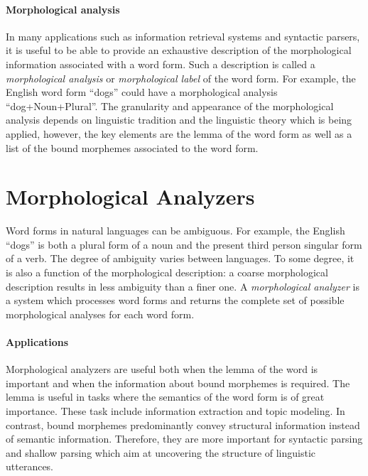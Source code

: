 \paragraph{Morphological analysis} In many applications such as
information retrieval systems and syntactic parsers, it is useful to
be able to provide an exhaustive description of the morphological
information associated with a word form. Such a description is called
a {\it morphological analysis} or {\it morphological label} of the word
form. For example, the English word form ``dogs'' could have a
morphological analysis ``dog+Noun+Plural''. The granularity and
appearance of the morphological analysis depends on linguistic
tradition and the linguistic theory which is being applied, however,
the key elements are the lemma of the word form as well as a list of
the bound morphemes associated to the word form.

\section{Morphological Analyzers}
Word forms in natural languages can be ambiguous. For example, the
English ``dogs'' is both a plural form of a noun and the present third
person singular form of a verb. The degree of ambiguity varies between
languages. To some degree, it is also a function of the morphological
description: a coarse morphological description results in less
ambiguity than a finer one. A {\it morphological analyzer} is a system
which processes word forms and returns the complete set of possible
morphological analyses for each word form.

\paragraph{Applications} Morphological analyzers are useful both when
the lemma of the word is important and when the information about
bound morphemes is required. The lemma is useful in tasks where the
semantics of the word form is of great importance. These task include
information extraction and topic modeling. In contrast, bound
morphemes predominantly convey structural information instead of semantic
information. Therefore, they are more important for syntactic parsing and
shallow parsing which aim at uncovering the structure of linguistic
utterances.

